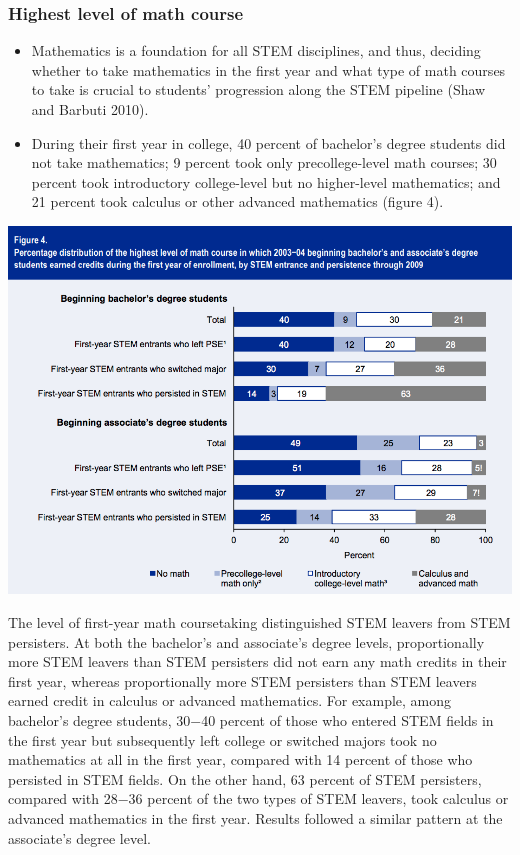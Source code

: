 \documentclass{beamer}
\begin{document}
\begin{frame}
  \frametitle{Highest level of math course}
  \begin{itemize}
  \item Mathematics is a foundation for all STEM disciplines, and thus, deciding whether to
take mathematics in the first year and what type of math courses to take is crucial to
students’ progression along the STEM pipeline (Shaw and Barbuti 2010). 

\item During their first year in college, 40 percent of bachelor’s degree students did not take
mathematics; 9 percent took only precollege-level math courses; 30 percent took
introductory college-level but no higher-level mathematics; and 21 percent took
calculus or other advanced mathematics (figure 4).
\end{itemize}
\end{frame}

\begin{frame}
  \includegraphics[scale = 0.33]{fig4.png}
\end{frame}


\begin{frame}
  The level of first-year math coursetaking distinguished STEM leavers from STEM
persisters. At both the bachelor’s and associate’s degree levels, proportionally more
STEM leavers than STEM persisters did not earn any math credits in their first year,
whereas proportionally more STEM persisters than STEM leavers earned credit in
calculus or advanced mathematics. For example, among bachelor’s degree students,
30−40 percent of those who entered STEM fields in the first year but subsequently left
college or switched majors took no mathematics at all in the first year, compared with
14 percent of those who persisted in STEM fields. On the other hand, 63 percent of STEM persisters, compared with 28−36 percent of the two types of STEM leavers,
took calculus or advanced mathematics in the first year. Results followed a similar
pattern at the associate’s degree level.
\end{frame}
\end{document}

